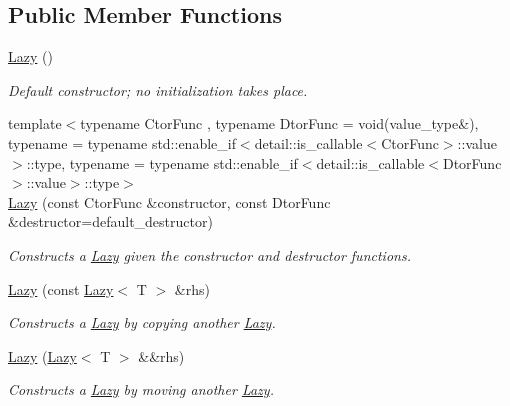 \subsection*{Public Member Functions}
\begin{DoxyCompactItemize}
\item 
\hyperlink{classlazy_1_1_lazy_ab0b3a3315445d3b4074d0e4aef5b942f}{Lazy} ()\hypertarget{classlazy_1_1_lazy_ab0b3a3315445d3b4074d0e4aef5b942f}{}\label{classlazy_1_1_lazy_ab0b3a3315445d3b4074d0e4aef5b942f}

\begin{DoxyCompactList}\small\item\em Default constructor; no initialization takes place. \end{DoxyCompactList}\item 
{\footnotesize template$<$typename Ctor\+Func , typename Dtor\+Func  = void(value\+\_\+type\&), typename  = typename std\+::enable\+\_\+if$<$detail\+::is\+\_\+callable$<$\+Ctor\+Func$>$\+::value$>$\+::type, typename  = typename std\+::enable\+\_\+if$<$detail\+::is\+\_\+callable$<$\+Dtor\+Func$>$\+::value$>$\+::type$>$ }\\\hyperlink{classlazy_1_1_lazy_ab22df7d508496365aff6a957bf962960}{Lazy} (const Ctor\+Func \&constructor, const Dtor\+Func \&destructor=default\+\_\+destructor)
\begin{DoxyCompactList}\small\item\em Constructs a {\ttfamily \hyperlink{classlazy_1_1_lazy}{Lazy}} given the {\ttfamily constructor} and {\ttfamily destructor} functions. \end{DoxyCompactList}\item 
\hyperlink{classlazy_1_1_lazy_abf313aba4efdae548e0424ac2b0bb933}{Lazy} (const \hyperlink{classlazy_1_1_lazy}{Lazy}$<$ T $>$ \&rhs)
\begin{DoxyCompactList}\small\item\em Constructs a {\ttfamily \hyperlink{classlazy_1_1_lazy}{Lazy}} by copying another {\ttfamily \hyperlink{classlazy_1_1_lazy}{Lazy}}. \end{DoxyCompactList}\item 
\hyperlink{classlazy_1_1_lazy_abc570e2165725815523fccb622420a72}{Lazy} (\hyperlink{classlazy_1_1_lazy}{Lazy}$<$ T $>$ \&\&rhs)
\begin{DoxyCompactList}\small\item\em Constructs a {\ttfamily \hyperlink{classlazy_1_1_lazy}{Lazy}} by moving another {\ttfamily \hyperlink{classlazy_1_1_lazy}{Lazy}}. \end{DoxyCompactList}\item 

\end{DoxyCompactItemize}
